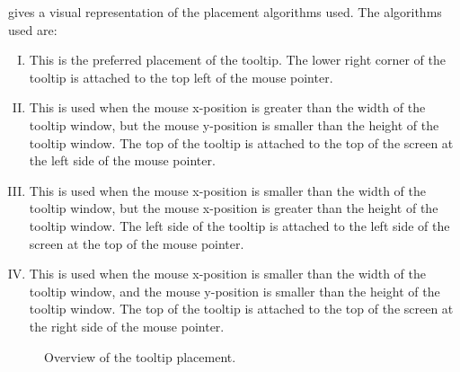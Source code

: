  gives a visual representation of the placement
algorithms used. The algorithms used are:
\begin{enumerate}[I.]
\item\label{sec:tooltip_placement:algorithm:I}
	This is the preferred placement of the tooltip. The lower right corner of
	the tooltip is attached to the top left of the mouse pointer.

\item\label{sec:tooltip_placement:algorithm:II}
	This is used when the mouse \mbox{x-position} is greater than the width of
	the tooltip window, but the mouse \mbox{y-position} is smaller than the
	height of the tooltip window. The top of the tooltip is attached to the top
	of the screen at the left side of the mouse pointer.

\item\label{sec:tooltip_placement:algorithm:III}
	This is used when the mouse \mbox{x-position} is smaller than the width of
	the tooltip window, but the mouse \mbox{x-position} is greater than the
	height of the tooltip window. The left side of the tooltip is attached to
	the left side of the screen at the top of the mouse pointer.

\item\label{sec:tooltip_placement:algorithm:IV}
	This is used when the mouse \mbox{x-position} is smaller than the width of
	the tooltip window, and the mouse \mbox{y-position} is smaller than the
	height of the tooltip window. The top of the tooltip is attached to the top
	of the screen at the right side of the mouse pointer.

\end{enumerate}

\begin{figure}[tbh]
\centering{}
\caption{Overview of the tooltip placement.}
\label{fig:tooltip_placement}
\end{figure}


